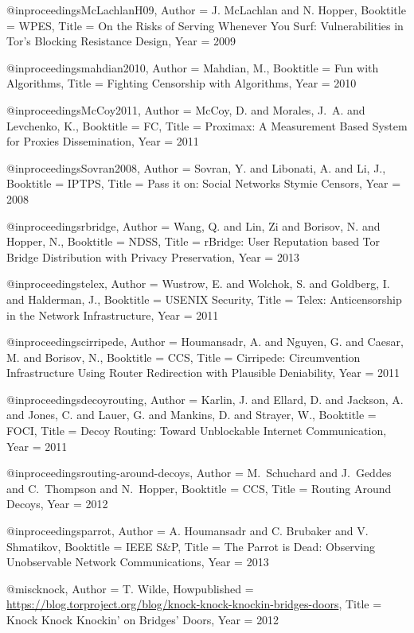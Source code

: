 {{{{{	@inproceedings{McLachlanH09,
	Author = {J. McLachlan and N. Hopper},
	Booktitle = {WPES},
	Title = {{On the Risks of Serving Whenever You Surf: Vulnerabilities in Tor's Blocking Resistance Design}},
	Year = {2009}}
	
	@inproceedings{mahdian2010,
	Author = {Mahdian, M.},
	Booktitle = {{Fun with Algorithms}},
	Title = {{Fighting Censorship with Algorithms}},
	Year = {2010}}
	
	@inproceedings{McCoy2011,
	Author = {McCoy, D. and Morales, J.~A. and Levchenko, K.},
	Booktitle = {FC},
	Title = {{Proximax: A Measurement Based System for Proxies Dissemination}},
	Year = {2011}}
	
	@inproceedings{Sovran2008,
	Author = {Sovran, Y. and Libonati, A. and Li, J.},
	Booktitle = {IPTPS},
	Title = {{Pass it on: Social Networks Stymie Censors}},
	Year = {2008}}
	
	@inproceedings{rbridge,
	Author = {Wang, Q. and Lin, Zi and Borisov, N. and Hopper, N.},
	Booktitle = {{NDSS}},
	Title = {{rBridge: User Reputation based Tor Bridge Distribution with Privacy Preservation}},
	Year = {2013}}
	
	@inproceedings{telex,
	Author = {Wustrow, E. and Wolchok, S. and Goldberg, I. and Halderman, J.},
	Booktitle = {{USENIX Security}},
	Title = {{Telex: Anticensorship in the Network Infrastructure}},
	Year = {2011}}
	
	@inproceedings{cirripede,
	Author = {Houmansadr, A. and Nguyen, G. and Caesar, M. and Borisov, N.},
	Booktitle = {CCS},
	Title = {{Cirripede: Circumvention Infrastructure Using Router Redirection with Plausible Deniability}},
	Year = {2011}}
	
	@inproceedings{decoyrouting,
	Author = {Karlin, J. and Ellard, D. and Jackson, A. and Jones, C. and Lauer, G. and Mankins, D. and Strayer, W.},
	Booktitle = {{FOCI}},
	Title = {{Decoy Routing: Toward Unblockable Internet Communication}},
	Year = {2011}}
	
	@inproceedings{routing-around-decoys,
	Author = {M.~Schuchard and J.~Geddes and C.~Thompson and N.~Hopper},
	Booktitle = {{CCS}},
	Title = {{Routing Around Decoys}},
	Year = {2012}}
	
	@inproceedings{parrot,
	Author = {A. Houmansadr and C. Brubaker and V. Shmatikov},
	Booktitle = {IEEE S\&P},
	Title = {{The Parrot is Dead: Observing Unobservable Network Communications}},
	Year = {2013}}
	
	@misc{knock,
	Author = {T. Wilde},
	Howpublished = {\url{https://blog.torproject.org/blog/knock-knock-knockin-bridges-doors}},
	Title = {{Knock Knock Knockin' on Bridges' Doors}},
	Year = {2012}}
	
}}}}}
